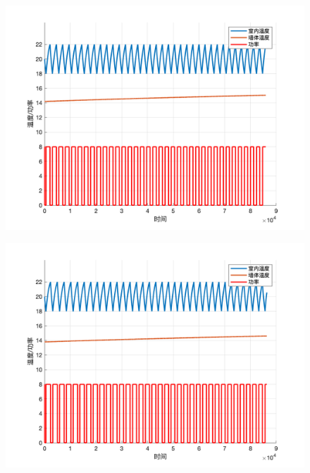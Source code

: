 \documentclass[withoutpreface,bwprint]{cumcmthesis} %
\begin{document}
\begin{figure}[H]
\begin{minipage}[c]{0.49\textwidth}
    \includegraphics[width=1\textwidth]{figures/1-20-15-10.png}
    \label{fig:my_label}
\end{minipage}
\begin{minipage}[c]{0.49\textwidth}
    \includegraphics[width=1\textwidth]{figures/1-20-15-15.png}
    \label{fig:my_label}
\end{minipage}
\begin{minipage}[c]{0.49\textwidth}

\end{minipage}
\end{figure}
\end{document}
